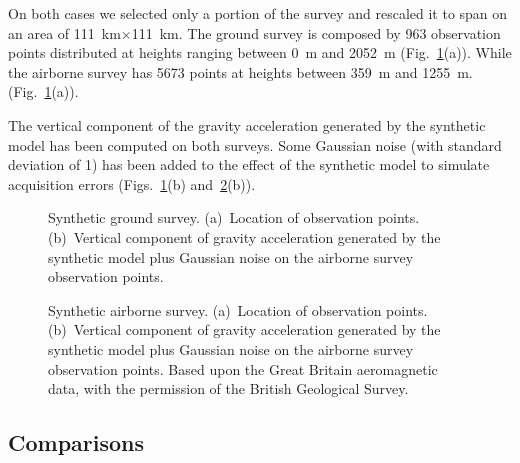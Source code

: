 \documentclass[twocolumn]{article}
\begin{document}
On both cases we selected only a portion of the survey and rescaled it to span
on an area of \SI{111}{\km}$\times$\SI{111}{\km}.
The ground survey is composed by 963 observation points distributed at heights
ranging between \SI{0}{\m} and \SI{2052}{\m}
(Fig.~\ref{fig:synthetic-ground-survey}(a)).
While the airborne survey has 5673 points at heights between \SI{359}{\m} and
\SI{1255}{\m}.
(Fig.~\ref{fig:synthetic-ground-survey}(a)).

The vertical component of the gravity acceleration generated by the synthetic
model has been computed on both surveys.
Some Gaussian noise (with standard deviation of \SI{1}{\mgal}) has been added
to the effect of the synthetic model to simulate acquisition errors
(Figs.~\ref{fig:synthetic-ground-survey}(b)
and~\ref{fig:synthetic-airborne-survey}(b)).

\begin{figure}
    \caption{
        Synthetic ground survey.
        (a)~Location of observation points.
        (b)~Vertical component of gravity acceleration generated by the
            synthetic model plus Gaussian noise on the airborne survey
            observation points.
    }
    \label{fig:synthetic-ground-survey}
\end{figure}

\begin{figure}
    \caption{
        Synthetic airborne survey.
        (a)~Location of observation points.
        (b)~Vertical component of gravity acceleration generated by the
            synthetic model plus Gaussian noise on the airborne survey
            observation points.
        Based upon the Great Britain aeromagnetic data, with the permission of
        the British Geological Survey.
    }
    \label{fig:synthetic-airborne-survey}
\end{figure}

\subsection{Comparisons}
\end{document}
